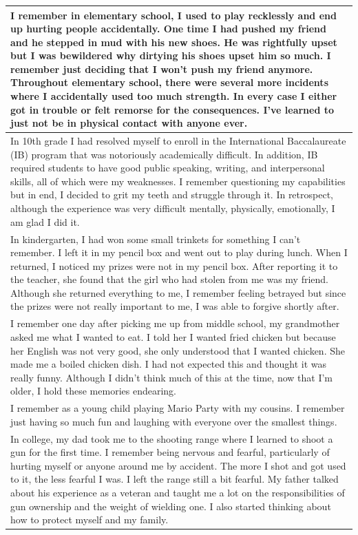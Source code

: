 \documentclass[
  .7em,
  letterpaper,
  DIV=11,
  numbers=noendperiod]{scrartcl}
\begin{document}
\begin{table}
\begin{tabular}{l}
\hline
I remember in elementary school, I used to play recklessly and end up hurting people accidentally. One time I had pushed my friend and he stepped in mud with his new shoes. He was rightfully upset but I was bewildered why dirtying his shoes upset him so much. I remember just deciding that I won’t push my friend anymore. Throughout elementary school, there were several more incidents where I accidentally used too much strength. In every case I either got in trouble or felt remorse for the consequences. I’ve learned to just not be in physical contact with anyone ever.\\
\hline
In 10th grade I had resolved myself to enroll in the International Baccalaureate (IB) program that was notoriously academically difficult. In addition, IB required students to have good public speaking, writing, and interpersonal skills, all of which were my weaknesses. I remember questioning my capabilities but in end, I decided to grit my teeth and struggle through it. In retrospect, although the experience was very difficult mentally, physically, emotionally, I am glad I did it.\\
\hline
In kindergarten, I had won some small trinkets for something I can’t remember. I left it in my pencil box and went out to play during lunch. When I returned, I noticed my prizes were not in my pencil box. After reporting it to the teacher, she found that the girl who had stolen from me was my friend. Although she returned everything to me, I remember feeling betrayed but since the prizes were not really important to me, I was able to forgive shortly after.\\
\hline
I remember one day after picking me up from middle school, my grandmother asked me what I wanted to eat. I told her I wanted fried chicken but because her English was not very good, she only understood that I wanted chicken. She made me a boiled chicken dish. I had not expected this and thought it was really funny. Although I didn’t think much of this at the time, now that I’m older, I hold these memories endearing.\\
\hline
I remember as a young child playing Mario Party with my cousins. I remember just having so much fun and laughing with everyone over the smallest things.\\
\hline
In college, my dad took me to the shooting range where I learned to shoot a gun for the first time. I remember being nervous and fearful, particularly of hurting myself or anyone around me by accident. The more I shot and got used to it, the less fearful I was. I left the range still a bit fearful. My father talked about his experience as a veteran and taught me a lot on the responsibilities of gun ownership and the weight of wielding one. I also started thinking about how to protect myself and my family.\\

\end{tabular}
\end{table}
\end{document}
